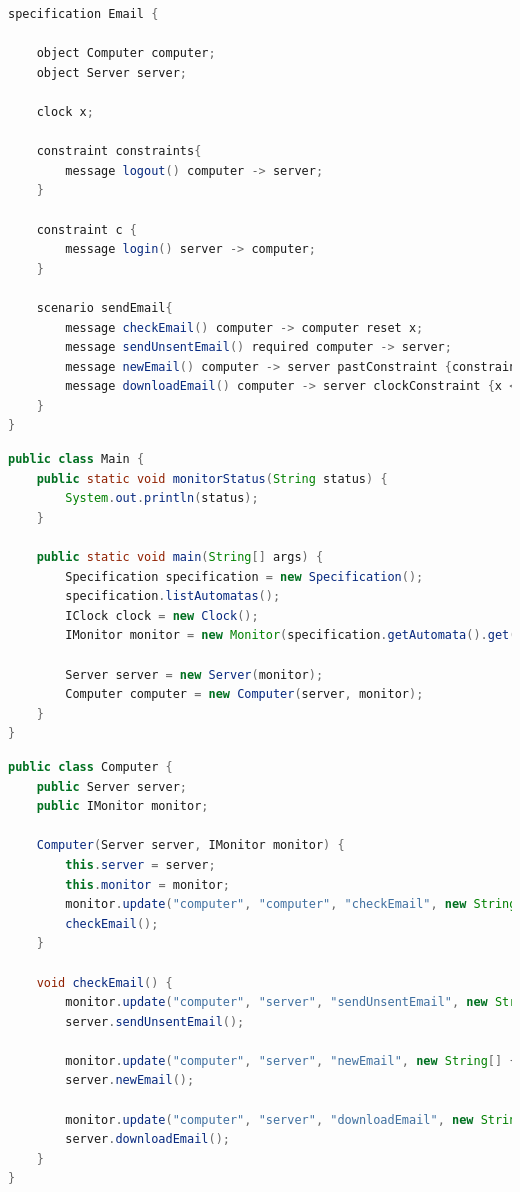 \begin{lstlisting}[language=java, frame=single, float=ht!, caption={Időzítési feltételeket tartalmazó scenario.},captionpos=b]
specification Email {

	object Computer computer;
	object Server server;

	clock x;

	constraint constraints{
		message logout() computer -> server;
	}

	constraint c {
		message login() server -> computer;
	}

	scenario sendEmail{
		message checkEmail() computer -> computer reset x;
		message sendUnsentEmail() required computer -> server;
		message newEmail() computer -> server pastConstraint {constraints};
		message downloadEmail() computer -> server clockConstraint {x < 10};
	}
}
\end{lstlisting}

\begin{lstlisting}[language=java, frame=single, float=ht!, caption={Időzítéses példához tartozó Main osztály.},captionpos=b]
public class Main {
	public static void monitorStatus(String status) {
		System.out.println(status);
	}

	public static void main(String[] args) {
		Specification specification = new Specification();
		specification.listAutomatas();
		IClock clock = new Clock();
		IMonitor monitor = new Monitor(specification.getAutomata().get(0), clock);

		Server server = new Server(monitor);
		Computer computer = new Computer(server, monitor);
	}
}
\end{lstlisting}

\begin{lstlisting}[language=java, frame=single, float=ht!, caption={A Computer java osztálya.},captionpos=b]
public class Computer {
	public Server server;
	public IMonitor monitor;

	Computer(Server server, IMonitor monitor) {
		this.server = server;
		this.monitor = monitor;
		monitor.update("computer", "computer", "checkEmail", new String[] {});
		checkEmail();
	}

	void checkEmail() {
		monitor.update("computer", "server", "sendUnsentEmail", new String[] {});
		server.sendUnsentEmail();

		monitor.update("computer", "server", "newEmail", new String[] {});
		server.newEmail();

		monitor.update("computer", "server", "downloadEmail", new String[] {});
		server.downloadEmail();
	}
}
\end{lstlisting}

